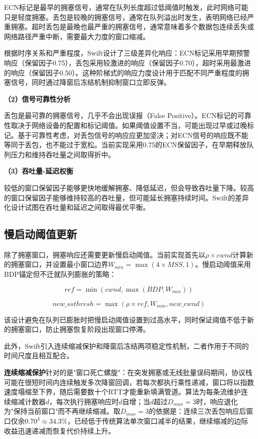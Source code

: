 ECN标记是最早的拥塞信号，通常在队列长度超过低阈值时触发，此时网络可能只是轻度拥塞。丢包是较晚的拥塞信号，通常在队列溢出时发生，表明网络已经严重拥塞。超时丢包是最晚也最严重的拥塞信号，通常意味着多个数据包连续丢失或网络路径严重中断，需要最大力度的窗口缩减。

根据时序关系和严重程度，Swift设计了三级差异化响应：ECN标记采用早期预警响应（保留因子0.75），丢包采用较激进的响应（保留因子0.70），超时采用最激进的响应（保留因子0.50）。这种阶梯式的响应力度设计用于匹配不同严重程度的拥塞信号，同时通过降窗后冻结机制抑制窗口立即反弹。

\textbf{（2）信号可靠性分析}

丢包是最可靠的拥塞信号，几乎不会出现误报（False Positive）。ECN标记的可靠性取决于网络设备的配置和标记阈值。如果阈值设置不当，可能出现过早或过晚标记。基于可靠性考虑，对丢包信号的响应应更加坚决；对ECN信号的响应既不能等同于丢包，也不能过于宽松。当前实现采用0.75的ECN保留因子，在早期释放队列压力和维持吞吐量之间取得折中。

\textbf{（3）吞吐量-延迟权衡}

较低的窗口保留因子能够更快地缓解拥塞、降低延迟，但会导致吞吐量下降。较高的窗口保留因子能够维持较高的吞吐量，但可能延长拥塞持续时间。Swift的差异化设计试图在吞吐量和延迟之间取得最优平衡。

\subsection{慢启动阈值更新}

除了拥塞窗口，拥塞响应还需要更新慢启动阈值。当前实现首先以$\rho \times cwnd$计算新的拥塞窗口，并设置最小窗口边界$W_{min}=\max(4\times MSS,1)$。慢启动阈值采用BDP锚定但不迁就队列膨胀的策略：

\begin{equation}
ref = \min(cwnd, \max(BDP, W_{min}))
\end{equation}

\begin{equation}
new\_ssthresh = \max(\rho \times ref, W_{min}, new\_cwnd)
\end{equation}

该设计避免在队列已膨胀时把慢启动阈值设置到过高水平，同时保证阈值不低于新的拥塞窗口，防止拥塞恢复阶段出现窗口停滞。

此外，Swift引入连续缩减保护和降窗后冻结两项稳定性机制，二者作用于不同的时间尺度且相互配合。

\textbf{连续缩减保护}针对的是"窗口死亡螺旋"：在突发拥塞或无线批量误码期间，协议栈可能在很短时间内连续触发多次降窗回调，若每次都执行乘性递减，窗口将以指数速度塌缩至下界，随后需要数十个RTT才能重新填满管道。算法为每条流维护连续缩减计数器$d$，每次执行拥塞响应时$d$自增；当$d$超过$D_{max} = 3$时，响应退化为"保持当前窗口"而不再继续缩减。取$D_{max} = 3$的依据是：连续三次丢包响应后窗口仅余$0.70^3 \approx 34.3\%$，已经低于传统算法单次窗口减半的结果，继续缩减的边际收益迅速递减而恢复代价持续上升。

